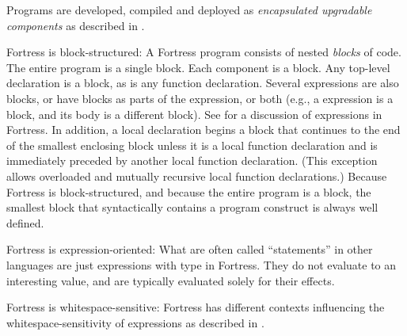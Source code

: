 Programs are developed, compiled and deployed
as \emph{encapsulated upgradable components}
as described in .

Fortress is block-structured:  A Fortress program
consists of nested \emph{blocks} of code.  The entire program is a
single block.  Each component is a block.
Any top-level declaration is a block, as is any function
declaration.  Several
expressions are also blocks, or have blocks as parts of the
expression, or both (e.g., a  expression is a
block, and its body is a different block).
See  for a discussion of
expressions in Fortress.
In addition, a local declaration begins a block that
continues to the end of the smallest enclosing block unless
it is a local function declaration
and is immediately preceded by another local function declaration.
(This exception allows
overloaded and mutually recursive local function declarations.)
Because Fortress is block-structured, and
because the entire program is a block, the smallest block
that syntactically contains a program construct is always well defined.


Fortress is expression-oriented:
What are often called ``statements'' in other languages
are just expressions with type \TYP{()} in Fortress.
They do not evaluate to an interesting value,
and are typically evaluated solely for their effects.


Fortress is whitespace-sensitive:
Fortress has different contexts influencing the
whitespace-sensitivity of expressions as described in
.
